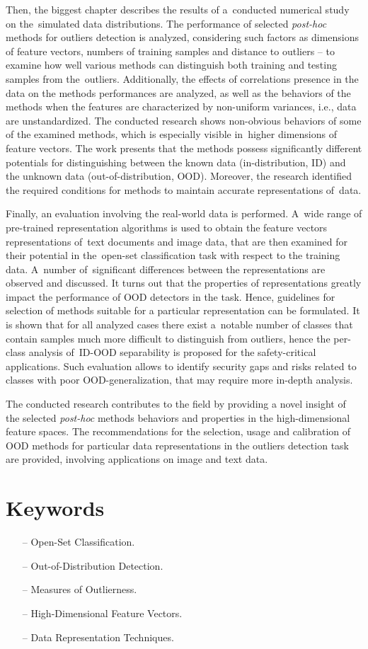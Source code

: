 Then, the biggest chapter describes the results of a~conducted numerical study on the~simulated data distributions. The performance of selected \textit{post-hoc} methods for outliers detection is analyzed, considering such factors as dimensions of feature vectors, numbers of training samples and distance to outliers – to examine how well various methods can distinguish both training and testing samples from the~outliers. Additionally, the effects of correlations presence in the data on the methods performances are analyzed, as well as the behaviors of the methods when the features are characterized by non-uniform variances, i.e., data are unstandardized. The conducted research shows non-obvious behaviors of some of the examined methods, which is especially visible in~higher dimensions of feature vectors. The work presents that the methods possess significantly different potentials for distinguishing between the known data (in-distribution, ID) and the unknown data (out-of-distribution, OOD). Moreover, the research identified the required conditions for methods to maintain accurate representations of~data.

Finally, an evaluation involving the real-world data is performed. A~wide range of pre-trained representation algorithms is used to obtain the feature vectors representations of~text documents and image data, that are then examined for their potential in the~open-set classification task with respect to the training data. A~number of~significant differences between the representations are observed and discussed. It turns out that the properties of representations greatly impact the performance of OOD detectors in the task. Hence, guidelines for selection of methods suitable for a particular representation can be formulated. It is shown that for all analyzed cases there exist a~notable number of classes that contain samples much more difficult to distinguish from outliers, hence the per-class analysis of~ID-OOD separability is proposed for the safety-critical applications. Such evaluation allows to identify security gaps and risks related to classes with poor OOD-generalization, that may require more in-depth analysis.

The conducted research contributes to the field by providing a novel insight of the selected \textit{post-hoc} methods behaviors and properties in the high-dimensional feature spaces. The recommendations for the selection, usage and calibration of OOD methods for particular data representations in the outliers detection task are provided, involving applications on image and text data.


\section*{Keywords}
\label{section:keywords}

\begin{itemize}
    \item[–] Open-Set Classification.
    \item[–] Out-of-Distribution Detection.
    \item[–] Measures of Outlierness.
    \item[–] High-Dimensional Feature Vectors.
    \item[–] Data Representation Techniques.
\end{itemize}
